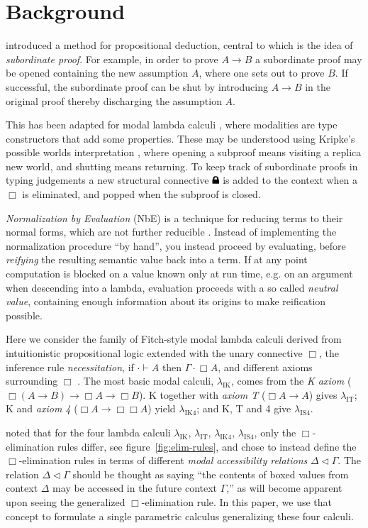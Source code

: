 \documentclass{article}
\newcommand{\lock}{
  \text{\tikz[baseline]{
      \fill[rounded corners=.1ex] (-.75ex,0) rectangle ++(1.5ex,1ex);
      \draw[line width=.3ex] (-.45ex,.5ex) -- ++(0,.75ex) arc (180:0:.45ex) -- ++(0,-.75ex);
}}}
\begin{document}
\section{Background}

\textcite{fitch52} introduced a method for propositional deduction,
central to which is the idea of \emph{subordinate proof}.
For example, in order to prove $A \rightarrow B$ a subordinate proof may be opened
containing the new assumption $A$, where one sets out to prove $B$.
If successful, the subordinate proof can be shut
by introducing $A \rightarrow B$ in the original proof
thereby discharging the assumption $A$.

This has been adapted for modal lambda calculi \cite{borghuis94},
where modalities are type constructors that add some properties.
These may be understood using Kripke's possible worlds interpretation \cite{kripke63, huth04},
where opening a subproof means visiting a replica new world,
and shutting means returning.
To keep track of subordinate proofs in typing judgements
a new structural connective $\lock$ is added to the context when a $\Box$ is eliminated,
and popped when the subproof is closed.

\emph{Normalization by Evaluation} (NbE) is a technique for reducing terms to their normal forms,
which are not further reducible \cite{berger91}.
Instead of implementing the normalization procedure ``by hand'',
you instead proceed by evaluating,
before \emph{reifying} the resulting semantic value back into a term.
If at any point computation is blocked on a value known only at run time,
e.g. on an argument when descending into a lambda,
evaluation proceeds with a so called \emph{neutral value},
containing enough information about its origins to make reification possible.

Here we consider the family of Fitch-style modal lambda calculi
derived from intuitionistic propositional logic
extended with the unary connective $\Box$,
the inference rule \emph{necessitation}, if $\cdot \vdash A$ then $\Gamma \cdot \Box A$,
and different axioms surrounding $\Box$ \cite{clouston18}.
The most basic modal calculi, $\lambda_\text{IK}$,
comes from the \emph{K axiom}
($\Box(A \rightarrow B) \rightarrow \Box A \rightarrow \Box B$).
K together with \emph{axiom T} ($\Box A \rightarrow A$) gives $\lambda_\text{IT}$;
K and \emph{axiom 4} ($\Box A \rightarrow \Box\Box A$) yield $\lambda_\text{IK4}$;
and K, T and 4 give $\lambda_\text{IS4}$.

\textcite{valliappan22} noted that for the four lambda calculi
$\lambda_\text{IK}$, $\lambda_\text{IT}$, $\lambda_\text{IK4}$, $\lambda_\text{IS4}$,
only the $\Box$-elimination rules differ,
see figure~\ref{fig:elim-rules},
and chose to instead define the $\Box$-elimination rules
in terms of different \emph{modal accessibility relations} $\Delta\lhd\Gamma$.
The relation $\Delta\lhd\Gamma$ should be thought as saying
``the contents of boxed values from context $\Delta$ may be accessed in the future context $\Gamma$,''
as will become apparent upon seeing the generalized $\Box$-elimination rule.
In this paper,
we use that concept to formulate a single parametric calculus generalizing these four calculi.
\end{document}
